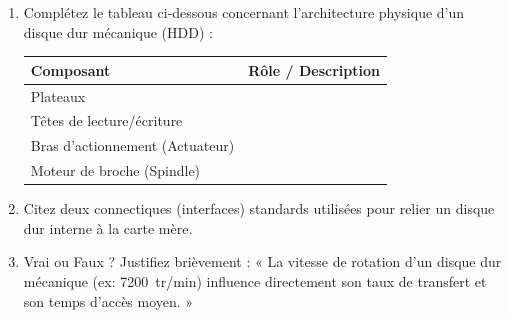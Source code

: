 \documentclass[11pt]{article}
\begin{document}
\begin{exercice}
\begin{enumerate}
    \item Complétez le tableau ci-dessous concernant l'architecture physique d'un disque dur mécanique (HDD) :
    \begin{tabular}{|l|p{10cm}|}
    \hline
    \textbf{Composant} & \textbf{Rôle / Description} \\
    \hline
    Plateaux & \underline{\hspace{10cm}} \\
    \hline
    Têtes de lecture/écriture & \underline{\hspace{10cm}} \\
    \hline
    Bras d'actionnement (Actuateur) & \underline{\hspace{10cm}} \\
    \hline
    Moteur de broche (Spindle) & \underline{\hspace{10cm}} \\
    \hline
    \end{tabular}
    \item Citez deux connectiques (interfaces) standards utilisées pour relier un disque dur interne à la carte mère.
    \item Vrai ou Faux ? Justifiez brièvement : « La vitesse de rotation d'un disque dur mécanique (ex: \SI{7200}{tr/min}) influence directement son taux de transfert et son temps d'accès moyen. »
\end{enumerate}
\end{exercice}
\end{document}
